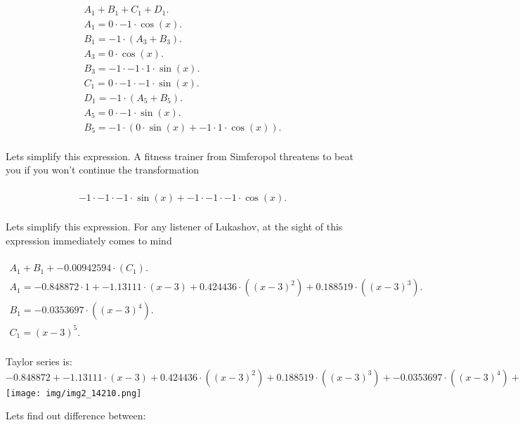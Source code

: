 \documentclass[12pt,a4paper]{extreport}
\begin{document}
\begin{multline}
\\
A_{1} + B_{1} + C_{1} + D_{1}.\\
A_{1} = 0 \cdot -1 \cdot \cos(x).\\
B_{1} = -1 \cdot (A_{3} + B_{3}).\\
A_{3} = 0 \cdot \cos(x).\\
B_{3} = -1 \cdot -1 \cdot 1 \cdot \sin(x).\\
C_{1} = 0 \cdot -1 \cdot -1 \cdot \sin(x).\\
D_{1} = -1 \cdot (A_{5} + B_{5}).\\
A_{5} = 0 \cdot -1 \cdot \sin(x).\\
B_{5} = -1 \cdot (0 \cdot \sin(x) + -1 \cdot 1 \cdot \cos(x)).\\
\end{multline}


Lets simplify this expression.
A fitness trainer from Simferopol\cite{SJ} threatens to beat you if you won't continue the transformation 

\begin{multline}
\\
-1 \cdot -1 \cdot -1 \cdot \sin(x) + -1 \cdot -1 \cdot -1 \cdot \cos(x).\\
\end{multline}


Lets simplify this expression.
For any listener of Lukashov, at the sight of this expression immediately comes to mind 

\begin{multline}
\\
A_{1} + B_{1} + -0.00942594 \cdot (C_{1}).\\
A_{1} = -0.848872 \cdot 1 + -1.13111 \cdot (x - 3) + 0.424436 \cdot ((x - 3) ^ {2}) + 0.188519 \cdot ((x - 3) ^ {3}).\\
B_{1} = -0.0353697 \cdot ((x - 3) ^ {4}).\\
C_{1} = (x - 3) ^ {5}.\\
\end{multline}

Taylor series is: 
$-0.848872 + -1.13111 \cdot (x - 3) + 0.424436 \cdot ((x - 3) ^ {2}) + 0.188519 \cdot ((x - 3) ^ {3}) + -0.0353697 \cdot ((x - 3) ^ {4}) + -0.00942594 \cdot ((x - 3) ^ {5})+ o((x - 3)^{5}).$\\

\texttt{[image: img/img2\_14210.png]}

Lets find out difference between:
\end{document}

